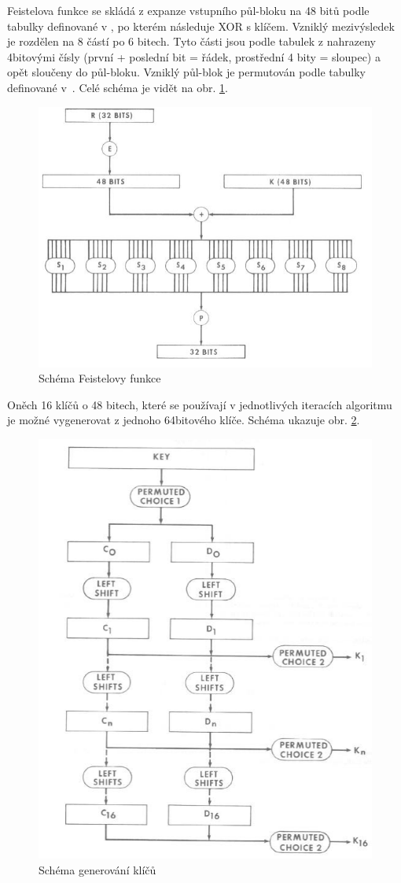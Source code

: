 \documentclass[12pt, a4paper]{article}
\begin{document}
Feistelova funkce se skládá z expanze vstupního půl-bloku na 48 bitů podle tabulky definované v \cite{fips46}, po kterém následuje XOR s klíčem.
Vzniklý mezivýsledek je rozdělen na 8 částí po 6 bitech.
Tyto části jsou podle tabulek z \cite{fips46} nahrazeny 4bitovými čísly (první + poslední bit = řádek, prostřední 4 bity = sloupec)  a opět sloučeny do půl-bloku.
Vzniklý půl-blok je permutován podle tabulky definované v~\cite{fips46}.
Celé schéma je vidět na obr. \ref{fig:img-feistel-function}.
\begin{figure}
	\centering
	\includegraphics[width=0.8\linewidth]{img-feistel-function}
	\caption{Schéma Feistelovy funkce \cite{fips46}}
	\label{fig:img-feistel-function}
\end{figure}

Oněch 16 klíčů o 48 bitech, které se používají v jednotlivých iteracích algoritmu je možné vygenerovat z jednoho 64bitového klíče.
Schéma ukazuje obr. \ref{fig:img-keygen}.
\begin{figure}
	\centering
	\includegraphics[width=0.6\linewidth]{img-keygen}
	\caption{Schéma generování klíčů \cite{fips46}}
	\label{fig:img-keygen}
\end{figure}
\end{document}
